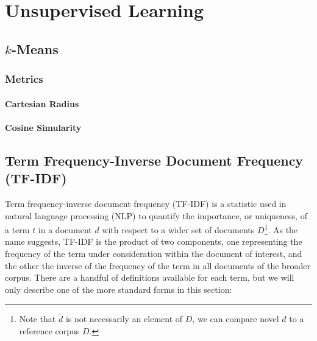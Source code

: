 \chapter{Unsupervised Learning}
\label{ml:unsupervised}

\section{\texorpdfstring{$k$}{k}-Means}
\label{ml:unsupervised:kMean}

\subsection{Metrics}
\label{ml:unsupervised:kMean:metrics}

\subsubsection{Cartesian Radius}
\label{ml:unsupervised:kMean:metrics:cartesian}


\subsubsection{Cosine Simularity}
\label{ml:unsupervised:kMean:metrics:cos}


\section{Term Frequency-Inverse Document Frequency (TF-IDF)}
\label{ml:unsupervised:tfidf}

Term frequency-inverse document frequency (TF-IDF) is a statistic
used in natural language processing (NLP) to quantify
the importance, or uniqueness, of a term $t$ in a document $d$
with respect to a wider set of documents $D$\footnote{Note that $d$ is not necessarily an element of $D$, we can compare novel $d$ to a reference corpus $D$.}.
As the name suggests, TF-IDF is the product of two components,
one representing the frequency of the term under consideration within the document of interest,
and the other the inverse of the frequency of the term in all documents of the broader corpus.
There are a handful of definitions available for each term, but we will only describe
one of the more standard forms in this section:

